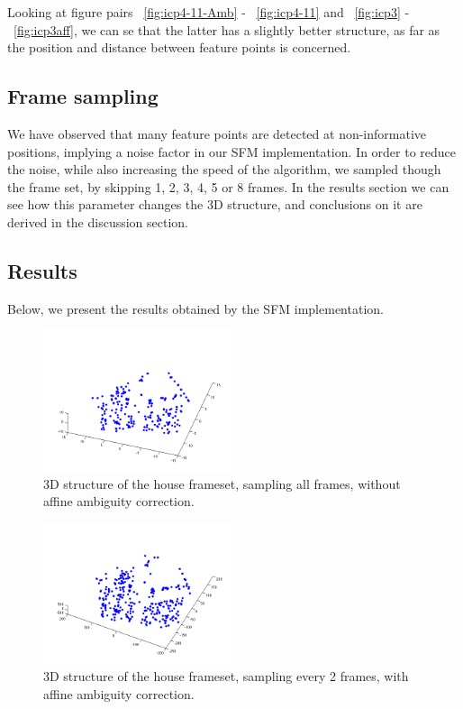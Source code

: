 Looking at figure pairs ~\ref{fig:icp4-11-Amb} - ~\ref{fig:icp4-11} and ~\ref{fig:icp3} - ~\ref{fig:icp3aff}, we can se that the latter has a slightly better structure, as far as the position and distance between feature points is concerned. 

\subsection{Frame sampling}
We have observed that many feature points are detected at non-informative positions, implying a noise factor in our SFM implementation. In order to reduce the noise, while also increasing the speed of the algorithm, we sampled though the frame set, by skipping 1, 2, 3, 4, 5 or 8 frames. In the results section we can see how this parameter changes the 3D structure, and conclusions on it are derived in the discussion section.


\subsection{Results}

Below, we present the results obtained by the SFM implementation. 

\begin{figure}[ht!]
  \centering
    \includegraphics[width=0.49\textwidth]{figures/icp1-46-Amb.png}
    \caption{3D structure of the house frameset, sampling all frames, without affine ambiguity correction.}
    \label{fig:icp1-46-Amb}
\end{figure}

\begin{figure}[ht!]
  \centering
    \includegraphics[width=0.49\textwidth]{figures/icp2-22.png}
    \caption{3D structure of the house frameset, sampling every 2 frames, with affine ambiguity correction.}
    \label{fig:icp2-22}
\end{figure}

